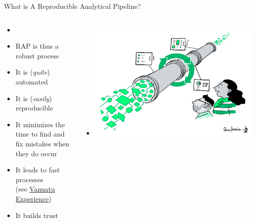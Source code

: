 \documentclass[xcolor=x11names,compress, aspectratio=169]{beamer}
\renewcommand{\(}{\begin{columns}}
\renewcommand{\)}{\end{columns}}
\newcommand{\<}[1]{\begin{column}{#1}}
\renewcommand{\>}{\end{column}}
\begin{document}
\begin{frame}{What is A Reproducible Analytical Pipeline?}
  \begin{columns}[T]
    \begin{column}{0.5\textwidth}

      \begin{itemize}[<+->]
        \item[] 
        \item RAP is thus a robust process
        \item It is (\emph{quite}) automated
        \item It is (\emph{easily}) reproducible
        \item It minimizes the time to find and fix mistakes when they do occur
        \item It leads to fast processes\\ (see \href{https://github.com/Vanuatu-National-Statistics-Office/vnso-RAP-marketStats-materials}{Vanuatu Experience})
        \item It builds trust
      \end{itemize}
    \end{column}
    \begin{column}{0.5\textwidth}
    \begin{itemize}
        \item[] \includegraphics[width=1.0\textwidth]{ReusablePipeline.png}
    \end{itemize}
    \end{column}
  \end{columns}
\end{frame}
\end{document}
